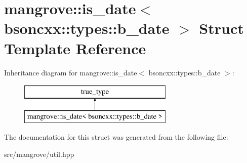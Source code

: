 \hypertarget{structmangrove_1_1is__date_3_01bsoncxx_1_1types_1_1b__date_01_4}{}\section{mangrove\+:\+:is\+\_\+date$<$ bsoncxx\+:\+:types\+:\+:b\+\_\+date $>$ Struct Template Reference}
\label{structmangrove_1_1is__date_3_01bsoncxx_1_1types_1_1b__date_01_4}
Inheritance diagram for mangrove\+:\+:is\+\_\+date$<$ bsoncxx\+:\+:types\+:\+:b\+\_\+date $>$\+:\begin{figure}[H]
\begin{center}
\leavevmode
\includegraphics[height=2.000000cm]{structmangrove_1_1is__date_3_01bsoncxx_1_1types_1_1b__date_01_4}
\end{center}
\end{figure}


The documentation for this struct was generated from the following file\+:\begin{DoxyCompactItemize}
\item 
src/mangrove/util.\+hpp\end{DoxyCompactItemize}
